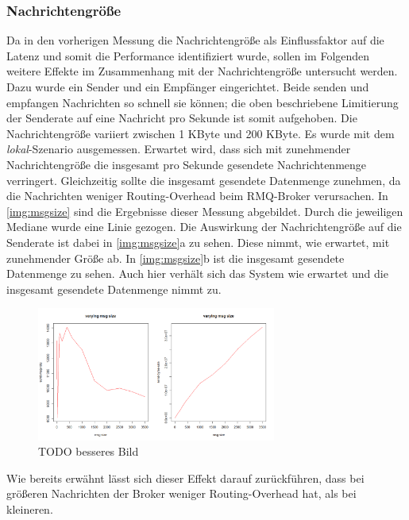 \subsubsection{Nachrichtengröße}
Da in den vorherigen Messung die Nachrichtengröße als Einflussfaktor auf die Latenz und somit die Performance identifiziert wurde, sollen im Folgenden weitere Effekte im Zusammenhang mit der Nachrichtengröße untersucht werden. Dazu wurde ein Sender und ein Empfänger eingerichtet. Beide senden und empfangen Nachrichten so schnell sie können; die oben beschriebene Limitierung der Senderate auf eine Nachricht pro Sekunde ist somit aufgehoben. Die Nachrichtengröße variiert zwischen 1 KByte und 200 KByte. Es wurde mit dem \textit{lokal}-Szenario ausgemessen. Erwartet wird, dass sich mit zunehmender Nachrichtengröße die insgesamt pro Sekunde gesendete Nachrichtenmenge verringert. Gleichzeitig sollte die insgesamt gesendete Datenmenge zunehmen, da die Nachrichten weniger Routing-Overhead beim RMQ-Broker verursachen.
In \autoref{img:msgsize} sind die Ergebnisse dieser Messung abgebildet. Durch die jeweiligen Mediane wurde eine Linie gezogen. Die Auswirkung der Nachrichtengröße auf die Senderate ist dabei in \autoref{img:msgsize}a zu sehen. Diese nimmt, wie erwartet, mit zunehmender Größe ab. In \autoref{img:msgsize}b ist die insgesamt gesendete Datenmenge zu sehen. Auch hier verhält sich das System wie erwartet und die insgesamt gesendete Datenmenge nimmt zu.
\begin{figure}
\center
  \includegraphics[width=0.7\textwidth]{images/msg-size.png}
  \caption{TODO besseres Bild}
  \label{img:msgsize}
\end{figure}
Wie bereits erwähnt lässt sich dieser Effekt darauf zurückführen, dass bei größeren Nachrichten der Broker weniger Routing-Overhead hat, als bei kleineren.


